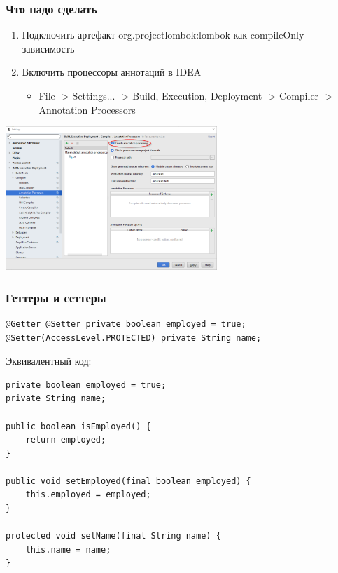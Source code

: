 \documentclass[xetex,mathserif,serif]{beamer}
\begin{document}
	\begin{frame}
		\frametitle{Что надо сделать}
		\begin{enumerate}
			\item Подключить артефакт org.projectlombok:lombok как compileOnly-зависимость
			\item Включить процессоры аннотаций в IDEA
			\begin{itemize}
				\item File -> Settings... -> Build, Execution, Deployment -> Compiler -> Annotation Processors
			\end{itemize}
		\end{enumerate}
		\begin{center}
			\includegraphics[width=0.6\textwidth]{annotationProcessors.png}
		\end{center}
	\end{frame}

	\begin{frame}[fragile]
		\frametitle{Геттеры и сеттеры}
		\begin{footnotesize}
			\begin{verbatim}
@Getter @Setter private boolean employed = true;
@Setter(AccessLevel.PROTECTED) private String name;
		\end{verbatim}
		Эквивалентный код:
		\begin{verbatim}
private boolean employed = true;
private String name;

public boolean isEmployed() {
    return employed;
}

public void setEmployed(final boolean employed) {
    this.employed = employed;
}

protected void setName(final String name) {
    this.name = name;
}
			\end{verbatim}
		\end{footnotesize}
	\end{frame}
\end{document}
